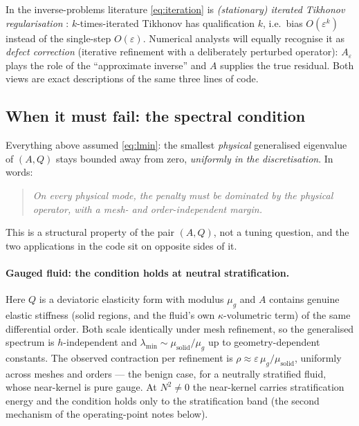 \documentclass[11pt]{article}
\newcommand{\eps}{\varepsilon}
\begin{document}
In the inverse-problems literature \eqref{eq:iteration} is
\emph{(stationary) iterated Tikhonov regularisation}
\cite{Lardy1975,EnglHankeNeubauer}: $k$-times-iterated Tikhonov has
qualification $k$, i.e.\ bias $O(\eps^{k})$ instead of the single-step
$O(\eps)$. Numerical analysts will equally recognise it as \emph{defect
correction} (iterative refinement with a deliberately perturbed
operator): $A_\eps$ plays the role of the ``approximate inverse'' and
$A$ supplies the true residual. Both views are exact descriptions of
the same three lines of code.

\subsection{When it must fail: the spectral condition}
\label{sec:failure}

Everything above assumed \eqref{eq:lmin}: the smallest \emph{physical}
generalised eigenvalue of $(A, Q)$ stays bounded away from zero,
\emph{uniformly in the discretisation}. In words:
\begin{quote}
  \emph{On every physical mode, the penalty must be dominated by the
  physical operator, with a mesh- and order-independent margin.}
\end{quote}
This is a structural property of the pair $(A, Q)$, not a tuning
question, and the two applications in the code sit on opposite sides of
it.

\paragraph{Gauged fluid: the condition holds at neutral stratification.}
Here $Q$ is a deviatoric elasticity form with modulus $\mu_{g}$ and $A$
contains genuine elastic stiffness (solid regions, and the fluid's own
$\kappa$-volumetric term) of the same differential order. Both scale
identically under mesh refinement, so the generalised spectrum is
$h$-independent and $\lambda_{\min} \sim \mu_{\mathrm{solid}}/\mu_{g}$
up to geometry-dependent constants. The observed contraction per
refinement is $\rho \approx \eps\,\mu_{g}/\mu_{\mathrm{solid}}$,
uniformly across meshes and orders --- the benign case, for a neutrally
stratified fluid, whose near-kernel is pure gauge. At $N^2 \neq 0$ the
near-kernel carries stratification energy and the condition holds only
to the stratification band (the second mechanism of the operating-point
notes below).
\end{document}
